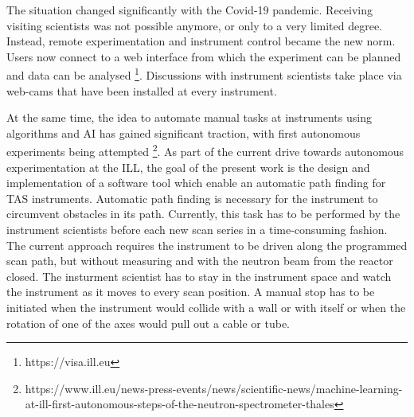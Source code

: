 The situation changed significantly with the Covid-19 pandemic. Receiving visiting scientists was not possible anymore, or only to a very limited degree. Instead, remote experimentation and instrument control became the new norm. Users now connect to a web interface from which the experiment can be planned and data can be analysed \footnote{https://visa.ill.eu}. Discussions with instrument scientists take place via web-cams that have been installed at every instrument.

At the same time, the idea to automate manual tasks at instruments using algorithms and AI has gained significant traction, with first autonomous experiments being attempted \footnote{https://www.ill.eu/news-press-events/news/scientific-news/machine-learning-at-ill-first-autonomous-steps-of-the-neutron-spectrometer-thales}.
As part of the current drive towards autonomous experimentation at the ILL, the goal of the present work is the design and implementation of a software tool which enable an automatic path finding for TAS instruments. Automatic path finding is necessary for the instrument to circumvent obstacles in its path. Currently, this task has to be performed by the instrument scientists before each new scan series in a time-consuming fashion. The current approach requires the instrument to be  driven along the programmed scan path, but without measuring and with the neutron beam from the reactor closed. The insturment scientist has to stay in the instrument space and watch the instrument as it moves to every scan position. A manual stop has to be initiated when the instrument would collide with a wall or with itself or when the rotation of one of the axes would pull out a cable or tube.
